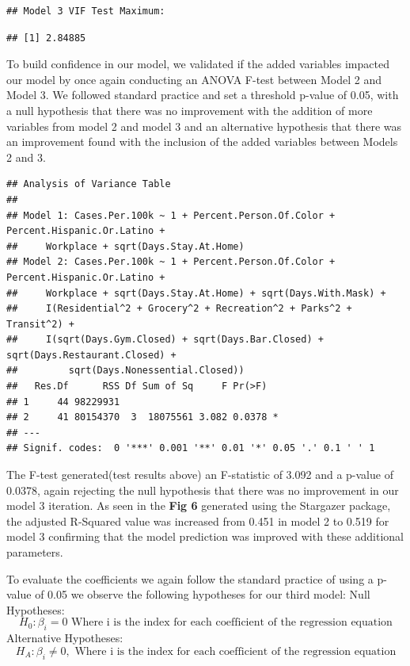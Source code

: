 \documentclass[
]{article}
\begin{document}
\begin{verbatim}
## Model 3 VIF Test Maximum:
\end{verbatim}

\begin{verbatim}
## [1] 2.84885
\end{verbatim}

To build confidence in our model, we validated if the added variables
impacted our model by once again conducting an ANOVA F-test between
Model 2 and Model 3. We followed standard practice and set a threshold
p-value of 0.05, with a null hypothesis that there was no improvement
with the addition of more variables from model 2 and model 3 and an
alternative hypothesis that there was an improvement found with the
inclusion of the added variables between Models 2 and 3.

\begin{verbatim}
## Analysis of Variance Table
## 
## Model 1: Cases.Per.100k ~ 1 + Percent.Person.Of.Color + Percent.Hispanic.Or.Latino + 
##     Workplace + sqrt(Days.Stay.At.Home)
## Model 2: Cases.Per.100k ~ 1 + Percent.Person.Of.Color + Percent.Hispanic.Or.Latino + 
##     Workplace + sqrt(Days.Stay.At.Home) + sqrt(Days.With.Mask) + 
##     I(Residential^2 + Grocery^2 + Recreation^2 + Parks^2 + Transit^2) + 
##     I(sqrt(Days.Gym.Closed) + sqrt(Days.Bar.Closed) + sqrt(Days.Restaurant.Closed) + 
##         sqrt(Days.Nonessential.Closed))
##   Res.Df      RSS Df Sum of Sq     F Pr(>F)  
## 1     44 98229931                            
## 2     41 80154370  3  18075561 3.082 0.0378 *
## ---
## Signif. codes:  0 '***' 0.001 '**' 0.01 '*' 0.05 '.' 0.1 ' ' 1
\end{verbatim}

The F-test generated(test results above) an F-statistic of 3.092 and a
p-value of 0.0378, again rejecting the null hypothesis that there was no
improvement in our model 3 iteration. As seen in the \textbf{Fig 6}
generated using the Stargazer package, the adjusted R-Squared value was
increased from 0.451 in model 2 to 0.519 for model 3 confirming that the
model prediction was improved with these additional parameters.

To evaluate the coefficients we again follow the standard practice of
using a p-value of 0.05 we observe the following hypotheses for our
third model: Null Hypotheses:
\[H_0 : \beta_i = 0 \text{ Where i is the index for each coefficient of the regression equation}\]
Alternative Hypotheses:
\[H_A : \beta_i \neq 0, \text{ Where i is the index for each coefficient of the regression equation}\]
\end{document}
